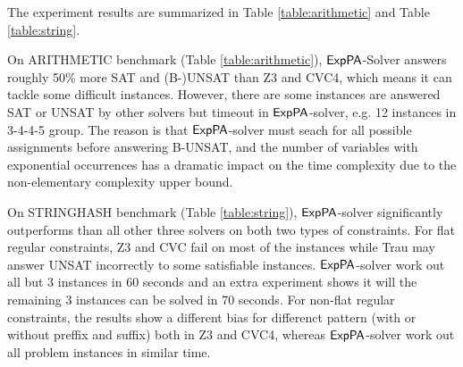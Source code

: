 The experiment results are summarized in Table \ref{table:arithmetic} and Table \ref{table:string}.  


On ARITHMETIC benchmark (Table \ref{table:arithmetic}), ${\sf ExpPA}$-Solver answers roughly 50\% more SAT and (B-)UNSAT than Z3 and CVC4, which means it can tackle some difficult instances. However, there are some instances are answered SAT or UNSAT by other solvers but timeout in ${\sf ExpPA}$-solver, e.g. 12 instances in 3-4-4-5 group. The reason is that ${\sf ExpPA}$-solver must seach for all possible assignments before answering B-UNSAT, and the number of variables with exponential occurrences has a dramatic impact on the time complexity due to the non-elementary complexity upper bound.


On STRINGHASH benchmark (Table \ref{table:string}), ${\sf ExpPA}$-solver significantly outperforms than all other three solvers on both two types of constraints. For flat regular constraints, Z3 and CVC fail on most of the instances while Trau may answer UNSAT incorrectly to some satisfiable instances. ${\sf ExpPA}$-solver work out all but 3 instances in 60 seconds and an extra experiment shows it will the remaining 3 instances can be solved in 70 seconds. For non-flat regular constraints, the results show a different bias for differenct pattern (with or without preffix and suffix) both in Z3 and CVC4, whereas ${\sf ExpPA}$-solver work out all problem instances in similar time. 



